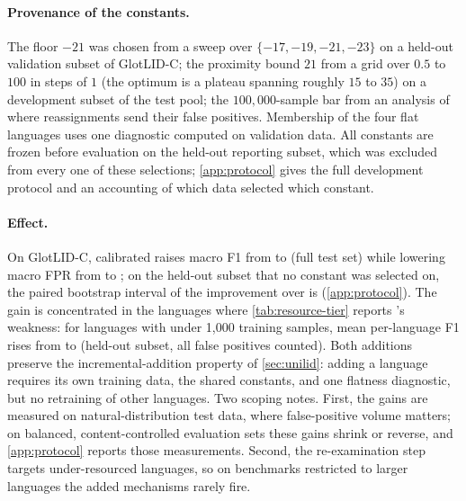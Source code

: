 \paragraph{Provenance of the constants.} The floor $-21$ was chosen from a
sweep over $\{-17, -19, -21, -23\}$ on a held-out validation subset of
GlotLID-C; the proximity bound $21$ from a grid over $0.5$ to $100$ in steps
of $1$ (the optimum is a plateau spanning roughly $15$ to $35$) on a
development subset of the test pool; the $100{,}000$-sample bar from an
analysis of where reassignments send their false positives. Membership of the
four flat languages uses one diagnostic computed on validation data. All
constants are frozen before evaluation on the held-out reporting subset, which
was excluded from every one of these selections; \cref{app:protocol} gives the
full
development protocol and an accounting of which data selected which constant.

\paragraph{Effect.} On GlotLID-C, calibrated \unilid raises macro F1 from
 to  (full test
set) while lowering macro FPR from  to
; on the held-out subset that no constant was
selected on, the paired bootstrap interval of the improvement over \unilid is
 (\cref{app:protocol}). The gain is concentrated
in the languages where \cref{tab:resource-tier} reports \unilid's weakness:
for languages with under 1{,}000 training samples, mean per-language F1 rises
from  to  (held-out
subset, all false positives counted). Both additions preserve the
incremental-addition property of \cref{sec:unilid}: adding a language requires
its own training data, the shared constants, and one flatness diagnostic, but
no retraining of other languages. Two scoping notes. First, the gains are
measured on natural-distribution test data, where false-positive volume
matters; on balanced, content-controlled evaluation sets these gains shrink or
reverse, and \cref{app:protocol} reports those measurements. Second, the
re-examination step targets under-resourced languages, so on benchmarks
restricted to larger languages the added mechanisms rarely fire.


